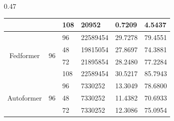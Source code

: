 \begin{table}[h]
\begin{subtable}{0.47\textwidth}
{\begin{tabular}{ccllll}
                                        &                         & 108  & 20952                                      & 0.7209                                   & 4.5437                                       \\
                                        \midrule
            \multirow{4}{*}{Fedformer}  & \multirow{4}{*}{96}  & 96   & 22589454                                   & 29.7278                                   & 79.4551                                       \\ 
            &   & 48   & 19815054                                   & 27.8697                                   & 74.3881                                       \\
                                        &                         & 72   & 21895854                                   & 28.2480                                   & 77.2284                                       \\
                                                                
                                        &                         & 108  & 22589454                                   & 30.5217                                   & 85.7943                                        \\
                                        \midrule
            \multirow{4}{*}{Autoformer} & \multirow{4}{*}{96}   & 96   & 7330252                                    & 13.3049                                   & 78.6800                                        \\
            &  & 48   & 7330252                                    & 11.4382                                   & 70.6933                                       \\
                                        &                         & 72   & 7330252                                    & 12.3086                                   & 75.0954                                       \\
                                                                 

\end{tabular}}
\end{subtable}
\end{table}
